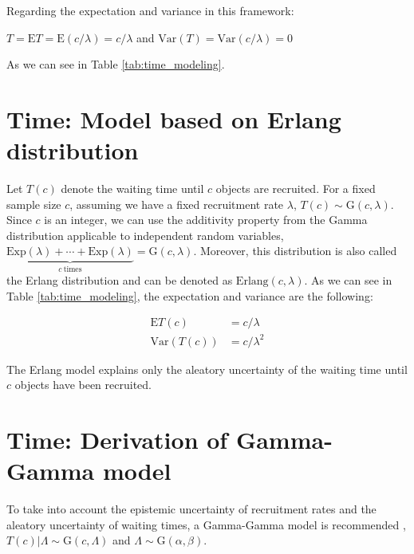 Regarding the expectation and variance in this framework:

$T = \textrm{E}T = \textrm{E}(c/\lambda) = c/\lambda$ and $\textrm{Var}(T) = \textrm{Var}(c/\lambda) = 0$

As we can see in Table \ref{tab:time_modeling}.

\section{Time: Model based on Erlang distribution}
Let $T(c)$ denote the waiting time until $c$ objects are recruited. For a fixed sample size $c$, assuming we have a fixed recruitment rate $\lambda$, $T(c)\sim\textrm{G}(c, \lambda)$. Since $c$ is an integer, we can use the additivity property from the Gamma distribution applicable to independent random variables, $\underbrace{\textrm{Exp} (\lambda) +\cdots +\textrm{Exp} (\lambda)}_{c \ \text{times}} = \textrm{G} (c, \lambda)$. Moreover, this distribution is also called the Erlang distribution and can be denoted as $\textrm{Erlang} (c, \lambda)$. As we can see in Table \ref{tab:time_modeling}, the expectation and variance are the following:

\begin{align*}
\textrm{E}T(c) & = c/\lambda\\
\textrm{Var}(T(c)) & = c/\lambda^2
\end{align*}

The Erlang model explains only the aleatory uncertainty of the waiting time until $c$ objects have been recruited.

\section{Time: Derivation of Gamma-Gamma model}

To take into account the epistemic uncertainty of recruitment rates and the aleatory uncertainty of waiting times, a Gamma-Gamma model is recommended \citep{bagiella2001predicting}, $T(c)|\Lambda \sim \textrm{G}(c, \Lambda)$ and $\Lambda \sim \textrm{G}(\alpha,\beta)$.


